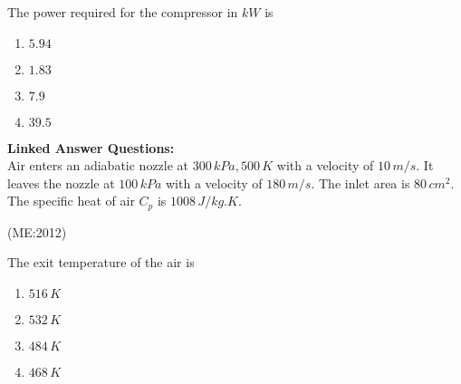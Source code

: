         \item
		The power required for the compressor in $kW$ is
		\label{d}
		\begin{multicols}{4}
        \begin{enumerate}
            \item $5.94$
            \item $1.83$
            \item $7.9$
            \item $39.5$
        \end{enumerate}
		\end{multicols}
\vspace{0.5cm}
    \textbf{Linked Answer Questions:}\\
    Air enters an adiabatic nozzle at $300 \, kPa, 500 \, K$ with a velocity of $10 \, m/s$. It leaves the nozzle at $100 \, kPa$ with a velocity of $180 \, m/s$. The inlet area is $80 \, {cm}^2$. The specific heat of air $C_p$ is $1008 \, J/kg.K$.

     \hfill{(ME:2012)}

        \item
		The exit temperature of the air is
		\begin{multicols}{4}
        \begin{enumerate}
            \item $516 \, K$
            \item $532 \, K$
            \item $484 \, K$
            \item $468 \, K$
        \end{enumerate}
		\end{multicols}



